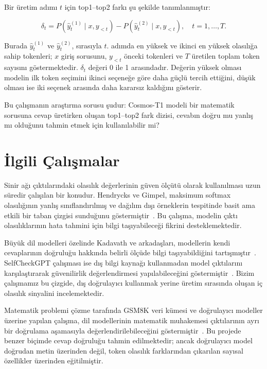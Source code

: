 \documentclass[conference]{IEEEtran}
\begin{document}
Bir üretim adımı $t$ için top1--top2 farkı şu şekilde tanımlanmıştır:

\begin{equation}
  \delta_t =
  P(\hat{y}^{(1)}_t \mid x, y_{<t}) -
  P(\hat{y}^{(2)}_t \mid x, y_{<t}),
  \quad t=1,\ldots,T .
  \label{eq:delta}
\end{equation}

Burada $\hat{y}^{(1)}_t$ ve $\hat{y}^{(2)}_t$, sırasıyla $t$. adımda en yüksek
ve ikinci en yüksek olasılığa sahip tokenleri; $x$ giriş sorusunu, $y_{<t}$
önceki tokenleri ve $T$ üretilen toplam token sayısını göstermektedir.
$\delta_t$ değeri 0 ile 1 arasındadır. Değerin yüksek olması modelin ilk token
seçimini ikinci seçeneğe göre daha güçlü tercih ettiğini, düşük olması ise iki
seçenek arasında daha kararsız kaldığını gösterir.

Bu çalışmanın araştırma sorusu şudur: Cosmos-T1 modeli bir matematik sorusuna
cevap üretirken oluşan top1--top2 fark dizisi, cevabın doğru mu yanlış mı
olduğunu tahmin etmek için kullanılabilir mi?

\section{İlgili Çalışmalar}

Sinir ağı çıktılarındaki olasılık değerlerinin güven ölçütü olarak kullanılması
uzun süredir çalışılan bir konudur. Hendrycks ve Gimpel, maksimum softmax
olasılığının yanlış sınıflandırılmış ve dağılım dışı örneklerin tespitinde basit
ama etkili bir taban çizgisi sunduğunu göstermiştir~\cite{hendrycks2016}.
Bu çalışma, modelin çıktı olasılıklarının hata tahmini için bilgi taşıyabileceği
fikrini desteklemektedir.

Büyük dil modelleri özelinde Kadavath ve arkadaşları, modellerin kendi
cevaplarının doğruluğu hakkında belirli ölçüde bilgi taşıyabildiğini
tartışmıştır~\cite{kadavath2022}. SelfCheckGPT çalışması ise dış bilgi kaynağı
kullanmadan model çıktılarını karşılaştırarak güvenilirlik değerlendirmesi
yapılabileceğini göstermiştir~\cite{selfcheckgpt}. Bizim çalışmamız bu çizgide,
dış doğrulayıcı kullanmak yerine üretim sırasında oluşan iç olasılık sinyalini
incelemektedir.

Matematik problemi çözme tarafında GSM8K veri kümesi ve doğrulayıcı modeller
üzerine yapılan çalışma, dil modellerinin matematik muhakemesi çıktılarının
ayrı bir doğrulama aşamasıyla değerlendirilebileceğini göstermiştir~\cite{gsm8k}.
Bu projede benzer biçimde cevap doğruluğu tahmin edilmektedir; ancak doğrulayıcı
model doğrudan metin üzerinden değil, token olasılık farklarından çıkarılan
sayısal özellikler üzerinden eğitilmiştir.
\end{document}
